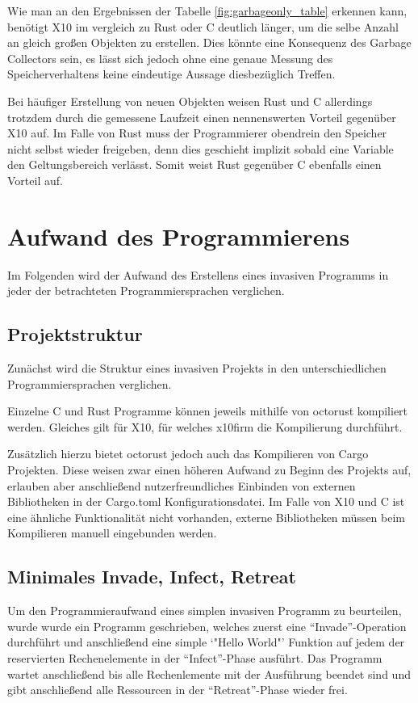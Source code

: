 Wie man an den Ergebnissen der Tabelle \ref{fig:garbageonly_table} erkennen kann,
benötigt X10 im vergleich zu Rust oder C deutlich länger, um die selbe Anzahl an gleich großen Objekten zu erstellen. 
Dies könnte eine Konsequenz des Garbage Collectors sein, es lässt sich jedoch ohne eine genaue Messung des
Speicherverhaltens keine eindeutige Aussage diesbezüglich Treffen.

Bei häufiger Erstellung von neuen Objekten weisen Rust und C allerdings trotzdem durch die gemessene Laufzeit
einen nennenswerten Vorteil gegenüber X10 auf. Im Falle von Rust muss der Programmierer obendrein
den Speicher nicht selbst wieder freigeben, denn dies geschieht implizit sobald eine Variable
den Geltungsbereich verlässt. Somit weist Rust gegenüber C ebenfalls einen Vorteil auf.

\section{Aufwand des Programmierens}

Im Folgenden wird der Aufwand des Erstellens eines invasiven Programms in jeder der betrachteten
Programmiersprachen verglichen.

\subsection{Projektstruktur}

Zunächst wird die Struktur eines invasiven Projekts in den unterschiedlichen Programmiersprachen verglichen.

Einzelne C und Rust Programme können jeweils mithilfe von octorust kompiliert werden. Gleiches gilt für X10, für
welches x10firm die Kompilierung durchführt.

Zusätzlich hierzu bietet octorust jedoch auch das Kompilieren von Cargo Projekten. Diese weisen zwar einen
höheren Aufwand zu Beginn des Projekts auf, erlauben aber anschließend nutzerfreundliches Einbinden von
externen Bibliotheken in der Cargo.toml Konfigurationsdatei. Im Falle von X10 und C ist eine ähnliche
Funktionalität nicht vorhanden, externe Bibliotheken müssen beim Kompilieren manuell eingebunden werden.

\subsection{Minimales Invade, Infect, Retreat}

Um den Programmieraufwand eines simplen invasiven Programm zu beurteilen, wurde wurde ein Programm geschrieben, 
welches zuerst eine "`Invade"'-Operation durchführt und anschließend eine simple `"Hello World"'
Funktion auf jedem der reservierten Rechenelemente in der "`Infect"'-Phase ausführt.
Das Programm wartet anschließend bis alle Rechenlemente mit der Ausführung beendet sind und gibt anschließend
alle Ressourcen in der "`Retreat"'-Phase wieder frei.

